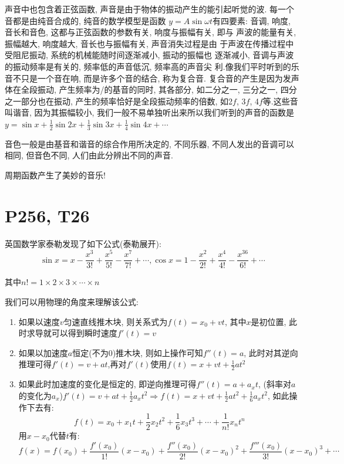 \documentclass{book}
\begin{document}
    声音中也包含着正弦函数, 声音是由于物体的振动产生的能引起听觉的波. 每一个音都是由纯音合成的, 纯音的数学模型是函数 $y=A\sin \omega t$有四要素:  音调, 响度, 音长和音色, 这都与正弦函数的参数有关, 响度与振幅有关, 即与 声波的能量有关, 振幅越大, 响度越大, 音长也与振幅有关, 声音消失过程是由 于声波在传播过程中受阻尼振动, 系统的机械能随时间逐渐减小, 振动的振幅也 逐渐减小, 音调与声波的振动频率是有关的, 频率低的声音低沉, 频率高的声音尖
    利.像我们平时听到的乐音不只是一个音在响, 而是许多个音的结合, 称为复合音.  复合音的产生是因为发声体在全段振动, 产生频率为/的基音的同时, 其各部分,  如二分之一, 三分之一, 四分之一部分也在振动, 产生的频率恰好是全段振动频率的倍数, 如2$f$, 3$f$, 4$f$等.这些音叫谐音, 因为其振幅较小, 我们一般不易单独听出来所以我们听到的声音的函数是$\displaystyle y=\sin x+\frac{1}{2}\sin 2x+\frac{1}{3}\sin 3x+\frac{1}{4}\sin 4x+\cdots$

    音色一般是由基音和谐音的综合作用所决定的, 不同乐器, 不同人发出的音调可以相同, 但音色不同, 人们由此分辨出不同的声音.
    
    周期函数产生了美妙的音乐!

    \section{\textcolor[rgb]{0.11,0.65,0.52}{P256, T26}}
    英国数学家泰勒发现了如下公式\textcolor[rgb]{0.38,0.11,0.2}{(泰勒展开)}:
    $$
    \sin x = x - \frac{x^3}{3!}+\frac{x^5}{5!}-\frac{x^7}{7!}+\cdots,
    \cos x = 1-\frac{x^2}{2!}+\frac{x^4}{4!}-\frac{x^36}{6!}+\cdots
    $$

    其中$n!=1\times2\times3\times\cdots\times n$

    我们可以用\textcolor[rgb]{0.75,0.17,0.22}{物理的角度}来理解该公式:

    \begin{enumerate}
        \item 如果以速度$v$匀速直线推木块, 则关系式为$f(t)=x_0+vt$, 其中$x$是初位置, 此时求导就可以得到瞬时速度$f'(t)=v$
        \item 如果以加速度$a$恒定(不为0)推木块, 则如上操作可知$f''(t)=a$, 此时对其逆向推理可得$f'(t)=v+at$,再对$\displaystyle f'(t)$使用$\displaystyle f(t) =x+vt+\frac{1}{2}at^2$
        \item 如果此时加速度的变化是恒定的, 即逆向推理可得$\displaystyle f''(t)=a+a_xt$, (斜率对$a$的变化为$a_x$)$\displaystyle f'(t)=v+at+\frac{1}{2}a_xt^2\Longrightarrow f(t)=x+vt+\frac{1}{2}at^2+\frac{1}{6}a_xt^2$, 如此操作下去有: $$f(t)=x_0+x_1t+\frac{1}{2}x_2t^2+\frac{1}{6}x_3t^3+\cdots+\frac{1}{n!}x_nt^n$$用$x-x_0$代替$t$有:$$f(x)=f(x_0)+\frac{f'(x_0)}{1!}(x-x_0)+\frac{f''(x_0)}{2!}(x-x_0)^2+\frac{f'''(x_0)}{3!}(x-x_0)^3+\cdots$$
    \end{enumerate}
\end{document}

